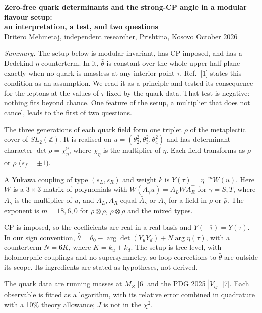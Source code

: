 \documentclass[10pt,a4paper]{article}
\makeatletter
\renewcommand\section{\@startsection{section}{1}{\z@}{-1.3ex plus -0.4ex}{0.4ex}{\normalfont\bfseries}}
\newcommand{\tb}{\bar\theta}
\makeatother
\begin{document}
\begin{center}
{\large\bfseries Zero-free quark determinants and the strong-CP angle in a modular flavour setup:\\
an interpretation, a test, and two questions}\\[4pt]
Dritëro Mehmetaj, independent researcher, Prishtina, Kosovo \quad October 2026
\end{center}

\textit{Summary.} The setup below is modular-invariant, has CP imposed, and has a Dedekind-$\eta$ counterterm. In it,
$\tb$ is constant over the whole upper half-plane exactly when no quark is massless at any interior point $\tau$.
Ref.~[1] states this condition as an assumption. We read it as a principle and tested its consequence for the
leptons at the values of $\tau$ fixed by the quark data. That test is negative: nothing fits beyond chance. One
feature of the setup, a multiplier that does not cancel, leads to the first of two questions.

\section{Setup}
The three generations of each quark field form one triplet $\rho$ of the metaplectic cover of $SL_2(\mathbb Z)$. It
is realised on $u=(\theta_2^2,\theta_3^2,\theta_4^2)$ and has determinant character $\det\rho=\chi_\eta^9$, where
$\chi_\eta$ is the multiplier of $\eta$. Each field transforms as $\rho$ or $\bar\rho$ ($s_f=\pm1$).

A Yukawa coupling of type $(s_L,s_R)$ and weight $k$ is $Y(\tau)=\eta^{-m}W(u)$. Here $W$ is a $3\times3$ matrix of
polynomials with $W(A_\gamma u)=A_L W A_R^{\top}$ for $\gamma=S,T$, where $A_\gamma$ is the multiplier of $u$, and $A_L,A_R$
equal $\bar A_\gamma$ or $A_\gamma$ for a field in $\rho$ or $\bar\rho$. The exponent is $m=18,6,0$ for $\rho\otimes\rho$, $\bar\rho\otimes\bar\rho$ and the mixed
types.

CP is imposed, so the coefficients are real in a real basis and $Y(-\bar\tau)=\overline{Y(\tau)}$. In our sign
convention, $\tb=\theta_0-\arg\det(Y_uY_d)+N\arg\eta(\tau)$, with a counterterm $N=6K$, where $K=k_u+k_d$. The setup
is tree level, with holomorphic couplings and no supersymmetry, so loop corrections to $\tb$ are outside its scope.
Its ingredients are stated as hypotheses, not derived.

The quark data are running masses at $M_Z$ [6] and the PDG 2025 $|V_{ij}|$ [7]. Each observable is fitted as a
logarithm, with its relative error combined in quadrature with a 10\% theory allowance; $J$ is not in the $\chi^2$.
\end{document}
